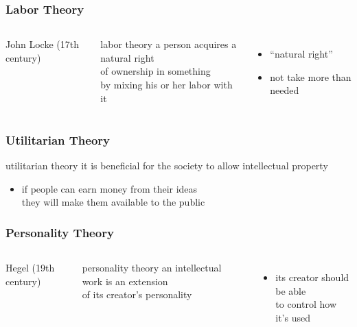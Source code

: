 \documentclass[dvipsnames]{beamer}
\theoremstyle{definition}
\theoremstyle{example}
\theoremstyle{plain}
\begin{document}
\begin{frame}
  \frametitle{Labor Theory}

  \begin{columns}
    \begin{center}

      John Locke (17th century)
    \end{center}

    \begin{block}{labor theory}
        a person acquires a natural right\\
        of ownership in something\\
        by mixing his or her labor with it
    \end{block}
    \begin{itemize}
      \item ``natural right''
      \item not take more than needed
    \end{itemize}
  \end{columns}
\end{frame}

\begin{frame}
  \frametitle{Utilitarian Theory}

  \begin{block}{utilitarian theory}
    it is beneficial for the society to allow intellectual property
  \end{block}

  \begin{itemize}
    \item if people can earn money from their ideas\\
      they will make them available to the public
  \end{itemize}
\end{frame}

\begin{frame}
  \frametitle{Personality Theory}

  \begin{columns}
    \begin{center}

      Hegel (19th century)
    \end{center}

    \begin{block}{personality theory}
      an intellectual work is an extension\\
      of its creator's personality
    \end{block}

    \begin{itemize}
      \item its creator should be able\\
        to control how it's used
    \end{itemize}
  \end{columns}
\end{frame}
\end{document}
